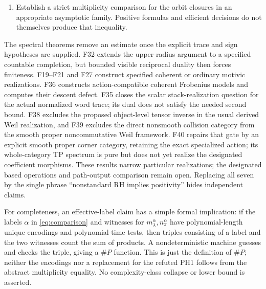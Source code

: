 \documentclass[11pt,a4paper]{article}
\theoremstyle{named}\newtheorem{finding}{Finding}[section]
\theoremstyle{definition}\newtheorem{definition}[finding]{Definition}
\theoremstyle{remark}\newtheorem{remark}[finding]{Remark}
\begin{document}
\begin{enumerate}
\item {} Establish a strict multiplicity comparison for the orbit closures in an appropriate asymptotic family. Positive formulas and efficient decisions do not themselves produce that inequality.
\end{enumerate}
The spectral theorems remove an estimate once the explicit trace and sign hypotheses are supplied. F32 extends the upper-radius argument to a specified countable completion, but bounded visible reciprocal duality then forces finiteness. F19--F21 and F27 construct specified coherent or ordinary motivic realizations. F36 constructs action-compatible coherent Frobenius models and computes their descent defect. F35 closes the scalar stack-realization question for the actual normalized word trace; its dual does not satisfy the needed second bound. F38 excludes the proposed object-level tensor inverse in the usual derived Weil realization, and F39 excludes the direct nonsmooth collision category from the smooth proper noncommutative Weil framework. F40 repairs that gate by an explicit smooth proper corner category, retaining the exact specialized action; its whole-category TP spectrum is pure but does not yet realize the designated coefficient morphisms. These results narrow particular realizations; the designated based operations and path-output comparison remain open. Replacing all seven by the single phrase ``nonstandard RH implies positivity'' hides independent claims.

For completeness, an effective-label claim has a simple formal implication: if the labels $\alpha$ in \eqref{eq:comparison} and witnesses for $m_\lambda^\alpha,n_\pi^\alpha$ have polynomial-length unique encodings and polynomial-time tests, then triples consisting of a label and the two witnesses count the sum of products. A nondeterministic machine guesses and checks the triple, giving a \(\#P\) function. This is just the definition of \(\#P\); neither the encodings nor a replacement for the refuted PH1 follows from the abstract multiplicity equality. No complexity-class collapse or lower bound is asserted.
\end{document}
